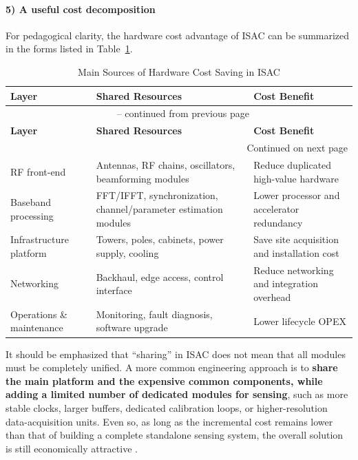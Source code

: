 \paragraph{5) A useful cost decomposition}
For pedagogical clarity, the hardware cost advantage of ISAC can be summarized in the forms listed in Table~\ref{tab:isac-hardware-saving}.

\begin{longtable}{p{3.3cm}p{4.8cm}p{5.2cm}}
\caption{Main Sources of Hardware Cost Saving in ISAC}
\label{tab:isac-hardware-saving} \\
\hline
\textbf{Layer} & \textbf{Shared Resources} & \textbf{Cost Benefit} \\
\hline
\endfirsthead

\multicolumn{3}{c}{\tablename~\thetable{} -- continued from previous page} \\
\hline
\textbf{Layer} & \textbf{Shared Resources} & \textbf{Cost Benefit} \\
\hline
\endhead

\hline
\multicolumn{3}{r}{Continued on next page} \\
\endfoot

\hline \hline
\endlastfoot

RF front-end & Antennas, RF chains, oscillators, beamforming modules & Reduce duplicated high-value hardware \\
Baseband processing & FFT/IFFT, synchronization, channel/parameter estimation modules & Lower processor and accelerator redundancy \\
Infrastructure platform & Towers, poles, cabinets, power supply, cooling & Save site acquisition and installation cost \\
Networking & Backhaul, edge access, control interface & Reduce networking and integration overhead \\
Operations \& maintenance & Monitoring, fault diagnosis, software upgrade & Lower lifecycle OPEX \\
\end{longtable}

It should be emphasized that ``sharing'' in ISAC does not mean that all modules must be completely unified. A more common engineering approach is to \textbf{share the main platform and the expensive common components, while adding a limited number of dedicated modules for sensing}, such as more stable clocks, larger buffers, dedicated calibration loops, or higher-resolution data-acquisition units. Even so, as long as the incremental cost remains lower than that of building a complete standalone sensing system, the overall solution is still economically attractive \cite{Liu2022ISAC, Wei2023Integrated}.

